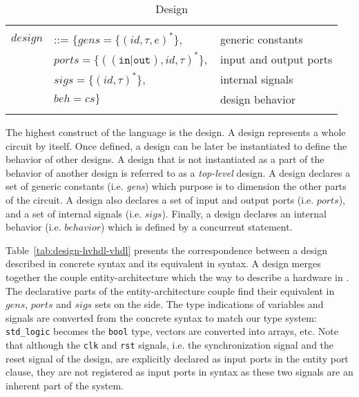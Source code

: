 \begin{table}[!htbp]
  \caption{Design}
  \label{tab:design}
  \begin{tabular}{|rll|}
    \hline
    & & \\
    $design$ & ::= $\{{}gens=\{(id,\tau,e)^{*}\},$ & generic constants \\
    & \quad\quad${}ports=\{((\mathtt{in}\vert\mathtt{out}),id,\tau)^{*}\},$ & input and output ports \\
    & \quad\quad${}sigs=\{(id,\tau)^{*}\},$ & internal signals \\
    & \quad\quad${}beh=cs\}$ & design behavior \\
    & & \\
    \hline
  \end{tabular}
\end{table}

The highest construct of the \hvhdl{} language is the design. A design
represents a whole circuit by itself. Once defined, a design can be
later be instantiated to define the behavior of other designs. A
design that is not instantiated as a part of the behavior of another
design is referred to as a \textit{top-level} design. A design
declares a set of generic constants (i.e. \textit{gens}) which purpose
is to dimension the other parts of the circuit. A design also declares
a set of input and output ports (i.e. $ports$), and a set of internal
signals (i.e. $sigs$). Finally, a design declares an internal behavior
(i.e. $behavior$) which is defined by a concurrent statement.

Table~\ref{tab:design-hvhdl-vhdl} presents the correspondence between
a design described in concrete \vhdl{} syntax and its equivalent in
\hvhdl{} syntax. A \hvhdl{} design merges together the couple
entity-architecture which the way to describe a hardware in
\vhdl{}. The declarative parts of the entity-architecture couple find
their equivalent in $gens$, $ports$ and $sigs$ sets on the \hvhdl{}
side. The type indications of variables and signals are converted from
the concrete syntax to match our type system: \texttt{std\_logic}
becomes the \texttt{bool} type, vectors are converted into arrays,
etc. Note that although the \texttt{clk} and \texttt{rst} signals,
i.e. the synchronization signal and the reset signal of the design,
are explicitly declared as input ports in the entity port clause, they
are not registered as input ports in \hvhdl{} syntax as these two
signals are an inherent part of the system.


